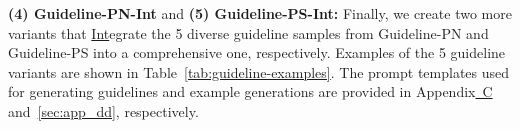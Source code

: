 \textbf{(4) Guideline-PN-Int} and \textbf{(5) Guideline-PS-Int:} Finally, we create two more variants that \underline{Int}egrate the 5 diverse guideline samples from Guideline-PN and Guideline-PS into a comprehensive one, respectively. 
Examples of the 5 guideline variants are shown in Table~\ref{tab:guideline-examples}.
The prompt templates used for generating guidelines and example generations
are provided in Appendix\hyperref[sec:prompt-design]{~C} and~\ref{sec:app_dd}, respectively.

